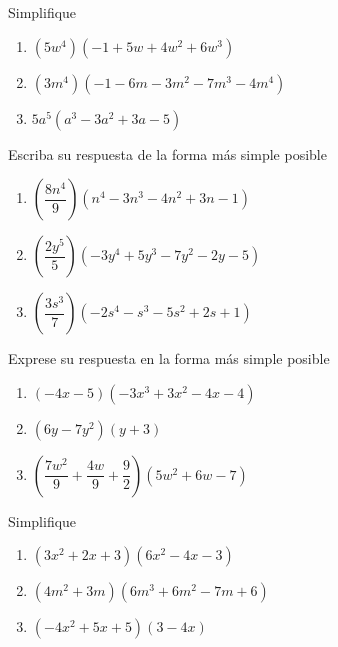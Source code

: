 	\begin{problema}
		Simplifique
		\begin{enumerate}
			\item $(5w^{4})\left( -1+5w+4w^{2}+6w^{3} \right)$
			\item $(3m^{4})\left( -1-6m-3m^{2}-7m^{3}-4m^{4} \right)$
			\item $5a^{5}\left( a^{3}-3a^{2}+3a-5 \right)$
		\end{enumerate}
		
	\end{problema}
	
	



	\begin{problema}
		Escriba su respuesta de la forma más simple posible
		\begin{enumerate}
			\item $\left( \dfrac{8n^{4}}{9} \right)\left( n^{4}-3n^{3}-4n^{2}+3n-1 \right)$
			\item $\left( \dfrac{2y^{5}}{5} \right)\left( -3y^{4}+5y^{3}-7y^{2}-2y-5 \right)$
			\item $\left( \dfrac{3s^{3}}{7} \right)\left( -2s^{4}-s^{3}-5s^{2}+2s+1 \right)$
		\end{enumerate}
		
	\end{problema}
	



	\begin{problema}
		Exprese su respuesta en la forma más simple posible
		\begin{enumerate}
			\item $\left( -4x-5 \right)\left( -3x^{3}+3x^{2}-4x-4 \right)$
			\item $\left( 6y-7y^{2} \right)\left( y+3 \right)$
			\item $\left( \dfrac{7w^{2}}{9}+\dfrac{4w}{9}+\dfrac{9}{2} \right)\left( 5w^{2}+6w-7 \right)$
		\end{enumerate}
		
	\end{problema}
	



	\begin{problema}
		Simplifique
		\begin{enumerate}
			\item $\left( 3x^{2}+2x+3 \right)\left( 6x^{2}-4x-3 \right)$
			\item $\left( 4m^{2}+3m \right)\left( 6m^{3}+6m^{2}-7m+6 \right)$
			\item $\left( -4x^{2}+5x+5 \right)\left( 3-4x \right)$
			
		\end{enumerate}
		
	\end{problema}
	



